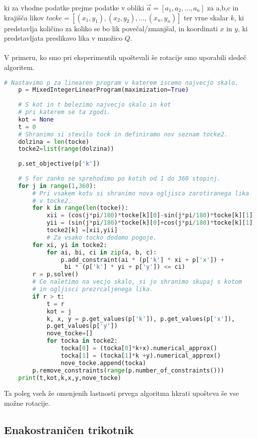 \documentclass[a4paper, 12pt]{article}
\begin{document}
ki za vhodne podatke prejme podatke v obliki $\vec{a} = [a_1,a_2,...,a_n]$ za a,b,c in krajišča likov $tocke = [(x_1,y_1),(x_2,y_2),...,(x_n,y_n)]$ 
ter vrne skalar $k$, ki predstavlja količino za koliko se bo lik povečal/zmanjšal, in koordinati $x$ in $y$, ki predstavljata preslikavo lika v množico $Q$.
\\~\\
V primeru, ko smo pri eksperimentih upoštevali še rotacije smo uporabili sledeč algoritem.
\begin{lstlisting}[language=Python]
    # Nastavimo p za linearen program v katerem iscemo najvecjo skalo.
    p = MixedIntegerLinearProgram(maximization=True)
    
    # S kot in t belezimo najvecjo skalo in kot
    # pri katerem se ta zgodi.
    kot = None
    t = 0
    # Shranimo si stevilo tock in definiramo nov seznam tocke2.
    dolzina = len(tocke)
    tocke2=list(range(dolzina))
    
    p.set_objective(p['k'])
    
    # S for zanko se sprehodimo po kotih od 1 do 360 stopinj.
    for j in range(1,360):
        # Pri vsakem kotu si shranimo nova ogljisca zarotiranega lika
        # v tocke2.
        for k in range(len(tocke)):
            xii = (cos(j*pi/180)*tocke[k][0]-sin(j*pi/180)*tocke[k][1])
            yii = (sin(j*pi/180)*tocke[k][0]+cos(j*pi/180)*tocke[k][1])
            tocke2[k] =[xii,yii]
            # Za vsako tocko dodamo pogoje.
        for xi, yi in tocke2:
            for ai, bi, ci in zip(a, b, c):
                p.add_constraint(ai * (p['k'] * xi + p['x']) +
                 bi * (p['k'] * yi + p['y']) <= ci)
        r = p.solve()
        # Ce naletimo na vecjo skalo, si jo shranimo skupaj s kotom
        # in ogljisci prezrcaljenega lika.
        if r > t:
            t = r
            kot = j
            k, x, y = p.get_values(p['k']), p.get_values(p['x']), 
            p.get_values(p['y'])
            nove_tocke=[]
            for tocka in tocke2:
                tocka[0] = (tocka[0]*k+x).numerical_approx()
                tocka[1] = (tocka[1]*k +y).numerical_approx()
                nove_tocke.append(tocka)
        p.remove_constraints(range(p.number_of_constraints()))
    print(t,kot,k,x,y,nove_tocke)
\end{lstlisting}
Ta poleg vseh že omenjenih lastnosti prvega algoritma hkrati upošteva še vse možne rotacije.
\subsection{Enakostraničen trikotnik}
\end{document}
